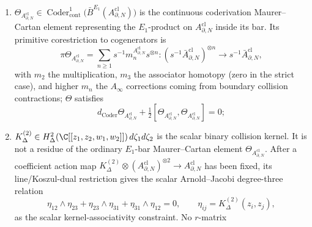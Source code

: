 \begin{thm}
\begin{enumerate}[label=\textup{(\roman*)}]
        Proposition~\ref{prop:diagonal-cohomology-operad} is a
        chiral-kernel decoration of the bar object; it becomes a
        coderivation only after a coefficient action map
        \(K^{(2)}_\Delta\otimes
          (A^{\mathrm{cl}}_{\partial,N})^{\otimes2}\to
          A^{\mathrm{cl}}_{\partial,N}\) is fixed;
  \item \(\Theta_{A^{\mathrm{cl}}_{\partial,N}}\in
        \operatorname{Coder}^1_{\mathrm{cont}}\!\bigl(
          \bar B^{E_1}(A^{\mathrm{cl}}_{\partial,N})\bigr)\) is the
        continuous coderivation Maurer--Cartan element representing the
        \(E_1\)-product on \(A^{\mathrm{cl}}_{\partial,N}\) inside its
        bar.  Its primitive corestriction to cogenerators is
        \[
          \pi\Theta_{A^{\mathrm{cl}}_{\partial,N}}
            =
            \sum_{n\ge 1}
            s^{-1}m_n^{A^{\mathrm{cl}}_{\partial,N}}s^{\otimes n}
              \colon
              (s^{-1}\bar A^{\mathrm{cl}}_{\partial,N})^{\otimes n}
              \to s^{-1}\bar A^{\mathrm{cl}}_{\partial,N},
        \]
        with \(m_2\) the multiplication, \(m_3\) the associator
        homotopy (zero in the strict case), and higher \(m_n\) the
        \(A_\infty\) corrections coming from boundary collision
        contractions; \(\Theta\) satisfies
\begin{equation}\label{eq:mc-bar-equation}
          d_{\operatorname{Coder}}\Theta_{A^{\mathrm{cl}}_{\partial,N}}
            +\tfrac12[\Theta_{A^{\mathrm{cl}}_{\partial,N}},
                       \Theta_{A^{\mathrm{cl}}_{\partial,N}}]=0;
\end{equation}
  \item \(K^{(2)}_\Delta\in
        H^2_\Delta(\C[[z_1,z_2,w_1,w_2]])\,d\zeta_1d\zeta_2\) is the
        scalar binary collision kernel.  It is not a residue of the
        ordinary \(E_1\)-bar Maurer--Cartan element
        \(\Theta_{A^{\mathrm{cl}}_{\partial,N}}\).  After a coefficient
        action map
        \(K^{(2)}_\Delta\otimes
        (A^{\mathrm{cl}}_{\partial,N})^{\otimes2}\to
        A^{\mathrm{cl}}_{\partial,N}\) has been fixed, its
        line/Koszul-dual restriction gives the scalar Arnold--Jacobi
        degree-three relation
\begin{equation}\label{eq:arnold-jacobi-from-mc-degree-three}
          \eta_{12}\wedge\eta_{23}
          +\eta_{23}\wedge\eta_{31}
          +\eta_{31}\wedge\eta_{12}=0,\qquad
          \eta_{ij}=K^{(2)}_\Delta(z_i,z_j),
\end{equation}
        as the scalar kernel-associativity constraint.  No \(r\)-matrix

\end{enumerate}
\end{thm}
